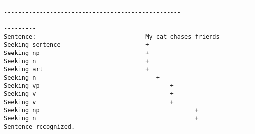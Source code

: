 \documentclass[ruled]{article}
\begin{document}
\begin{itemize}
\begin{verbatim}
------------------------------------------------------------------------------------------------------------------------

---------
Sentence:                               My cat chases friends
Seeking sentence                        +
Seeking np                              +
Seeking n                               +
Seeking art                             +
Seeking n                                  +
Seeking vp                                     +
Seeking v                                      +
Seeking v                                      +
Seeking np                                            +
Seeking n                                             +
Sentence recognized.
\end{verbatim}
\end{itemize}
\newpage
\end{document}
